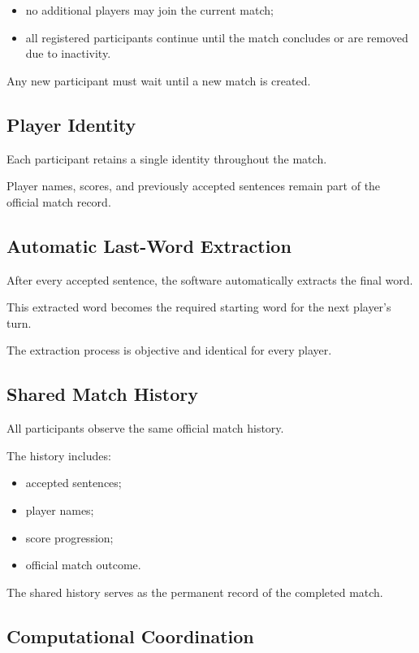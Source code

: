 \documentclass[11pt,a4paper]{article}
\begin{document}
\begin{itemize}
    \item no additional players may join the current match;
    \item all registered participants continue until the match concludes or are removed due to inactivity.
\end{itemize}

Any new participant must wait until a new match is created.

\subsection{Player Identity}

Each participant retains a single identity throughout the match.

Player names, scores, and previously accepted sentences remain part of the official match record.

\subsection{Automatic Last-Word Extraction}

After every accepted sentence, the software automatically extracts the final word.

This extracted word becomes the required starting word for the next player's turn.

The extraction process is objective and identical for every player.

\subsection{Shared Match History}

All participants observe the same official match history.

The history includes:

\begin{itemize}
    \item accepted sentences;
    \item player names;
    \item score progression;
    \item official match outcome.
\end{itemize}

The shared history serves as the permanent record of the completed match.

\subsection{Computational Coordination}
\end{document}
